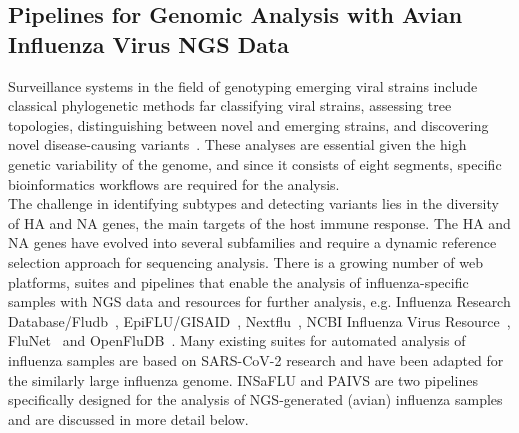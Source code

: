 \subsection{Pipelines for Genomic Analysis with Avian Influenza Virus NGS Data}\label{sec:2-aiv-pipelines}
Surveillance systems in the field of genotyping emerging viral strains include classical phylogenetic methods far classifying viral strains, assessing tree topologies, distinguishing between novel and emerging strains, and discovering novel disease-causing variants~\cite{koboldt2013next}. These analyses are essential given the high genetic variability of the genome, and since it consists of eight segments, specific bioinformatics workflows are required for the analysis. \\
The challenge in identifying subtypes and detecting variants lies in the diversity of \ac{HA} and \ac{NA} genes, the main targets of the host immune response. The \ac{HA} and \ac{NA} genes have evolved into several subfamilies and require a dynamic reference selection approach for sequencing analysis. There is a growing number of web platforms, suites and pipelines that enable the analysis of influenza-specific samples with \ac{NGS} data and resources for further analysis, e.g. Influenza Research Database/Fludb~\cite{zhang2017influenza}, EpiFLU/GISAID~\cite{shu2017gisaid}, Nextflu~\cite{neher2015nextflu}, NCBI Influenza Virus Resource~\cite{bao2008influenza}, FluNet~\cite{flahault1998flunet} and OpenFluDB~\cite{liechti2010openfludb}. Many existing suites for automated analysis of influenza samples are based on \ac{SARS-CoV-2} research and have been adapted for the similarly large influenza genome. \ac{INSaFLU} and \ac{PAIVS} are two pipelines specifically designed for the analysis of \ac{NGS}-generated (avian) influenza samples and are discussed in more detail below.

